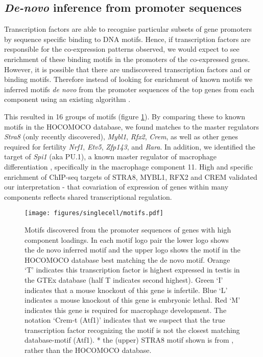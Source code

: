 \subsection{\emph{De-novo} inference from promoter sequences}
Transcription factors are able to recognise particular subsets of gene promoters by sequence specific binding to DNA motifs. Hence, if transcription factors are responsible for the co-expression patterns observed, we would expect to see enrichment of these binding motifs in the promoters of the co-expressed genes. However, it is possible that there are undiscovered transcription factors and or binding motifs. Therefore instead of looking for enrichment of known motifs we inferred motifs \textit{de novo} from the promoter sequences of the top genes from each component using an existing algorithm \parencite{Altemose2017map, Davies2016Reengineering}.

This resulted in 16 groups of motifs (figure \ref{fig:motifs}). By comparing these to known motifs in the HOCOMOCO database, we found matches to the master regulators \textit{Stra8} (only recently discovered), \textit{Mybl1}, \textit{Rfx2}, \textit{Crem}, as well as other genes required for fertility \textit{Nrf1}, \textit{Etv5}, \textit{Zfp143}, and \textit{Rara}. In addition, we identified the target of \textit{Spi1} (aka PU.1), a known master regulator of macrophage differentiation \parencite{Rosa2007interplay}, specifically in the macrophage component 11. High and specific enrichment of ChIP-seq targets of STRA8, MYBL1, RFX2 and CREM validated our interpretation - that covariation of expression of genes within many components reflects shared transcriptional regulation.

\begin{figure}[H]
	\centering
	\texttt{[image: figures/singlecell/motifs.pdf]}
	\caption[Denovo Motifs]{
		Motifs discovered from the promoter sequences of genes with high component loadings. In each motif logo pair the lower logo shows the de novo inferred motif and the upper logo shows the motif in the HOCOMOCO database best matching the de novo motif. Orange ‘T’ indicates this transcription factor is highest expressed in testis in the GTEx database (half T indicates second highest). Green ‘I’ indicates that a mouse knockout of this gene is infertile. Blue ‘L’ indicates a mouse knockout of this gene is embryonic lethal. Red ‘M’ indicates this gene is required for macrophage development. The notation ‘Crem-t (Atf1)’ indicates that we suspect that the true transcription factor recognizing the motif is not the closest matching database-motif (Atf1). * the (upper) STRA8 motif shown is from \cite{Kojima2019Amplification}, rather than the HOCOMOCO database.
	}
	\label{fig:motifs}
\end{figure}


